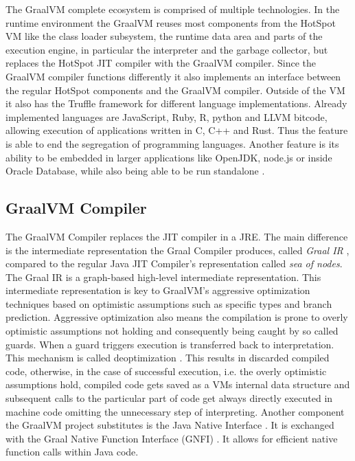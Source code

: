 The GraalVM complete ecosystem is comprised of multiple technologies. In the runtime environment the GraalVM reuses most components from the HotSpot VM like the class loader subsystem, the runtime data area and parts of the execution engine, in particular the interpreter and the garbage collector, but replaces the HotSpot JIT compiler with the GraalVM compiler. Since the GraalVM compiler functions differently it also implements an interface between the regular HotSpot components and the GraalVM compiler. Outside of the VM it also has the Truffle framework for different language implementations. Already implemented languages are JavaScript, Ruby, R, python and LLVM bitcode, allowing execution of applications written in C, C++ and Rust. Thus the feature is able to end the segregation of programming languages. Another feature is its ability to be embedded in larger applications like OpenJDK, node.js or inside Oracle Database, while also being able to be run standalone \cite{graalVMStart}.

\subsection{GraalVM Compiler}\label{sec:graalcomp}
The GraalVM Compiler replaces the JIT compiler in a JRE. The main difference is the intermediate representation the Graal Compiler produces, called \emph{Graal IR} \cite{inproceedings}, compared to the regular Java JIT Compiler's representation called \emph{sea of nodes}. The Graal IR is a graph-based high-level intermediate representation. This intermediate representation is key to GraalVM's aggressive optimization techniques based on optimistic assumptions such as specific types and branch prediction. Aggressive optimization also means the compilation is prone to overly optimistic assumptions not holding and consequently being caught by so called guards. When a guard triggers execution is transferred back to interpretation. This mechanism is called deoptimization \cite{ChambDeopt}. This results in discarded compiled code, otherwise, in the case of successful execution, i.e. the overly optimistic assumptions hold, compiled code gets saved as a VMs internal data structure and subsequent calls to the particular part of code get always directly executed in machine code omitting the unnecessary step of interpreting. Another component the GraalVM project substitutes is the Java Native Interface \cite{Lindholm}. It is exchanged with the Graal Native Function Interface (GNFI) \cite{grimmerNative}. It allows for efficient native function calls within Java code.

